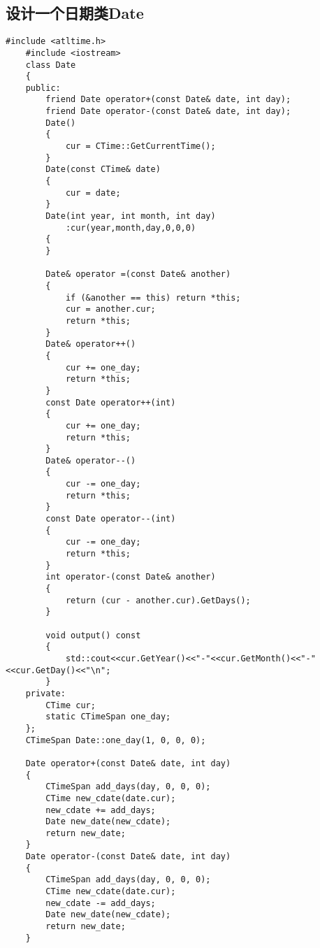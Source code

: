\documentclass[UTF8]{ctexart}
\begin{document}
 \subsection{设计一个日期类Date}
\begin{lstlisting}[language={[ANSI]C++}]
    #include <atltime.h>
    #include <iostream>
    class Date
    {
    public:
        friend Date operator+(const Date& date, int day);
        friend Date operator-(const Date& date, int day);
        Date()
        {
            cur = CTime::GetCurrentTime();
        }
        Date(const CTime& date)
        {
            cur = date;
        }
        Date(int year, int month, int day)
            :cur(year,month,day,0,0,0)
        {
        }
    
        Date& operator =(const Date& another)
        {
            if (&another == this) return *this;
            cur = another.cur;
            return *this;
        }
        Date& operator++()
        {
            cur += one_day;
            return *this;
        }
        const Date operator++(int)
        {
            cur += one_day;
            return *this;
        }
        Date& operator--()
        {
            cur -= one_day;
            return *this;
        }
        const Date operator--(int)
        {
            cur -= one_day;
            return *this;
        }
        int operator-(const Date& another)
        {
            return (cur - another.cur).GetDays();
        }
    
        void output() const
        {
            std::cout<<cur.GetYear()<<"-"<<cur.GetMonth()<<"-"<<cur.GetDay()<<"\n";
        }
    private:
        CTime cur;
        static CTimeSpan one_day;
    };
    CTimeSpan Date::one_day(1, 0, 0, 0);
    
    Date operator+(const Date& date, int day)
    {
        CTimeSpan add_days(day, 0, 0, 0);
        CTime new_cdate(date.cur);
        new_cdate += add_days;
        Date new_date(new_cdate);
        return new_date;
    }
    Date operator-(const Date& date, int day)
    {
        CTimeSpan add_days(day, 0, 0, 0);
        CTime new_cdate(date.cur);
        new_cdate -= add_days;
        Date new_date(new_cdate);
        return new_date;
    }
    
    
\end{lstlisting}
\end{document}
